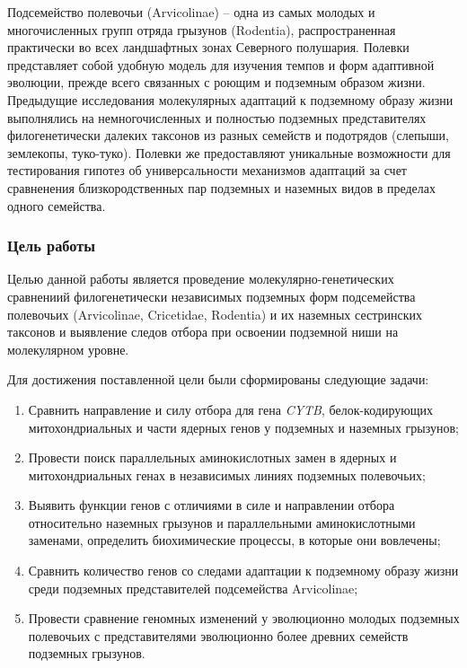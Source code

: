 Подсемейство полевочьи (Arvicolinae) -- одна из самых молодых и многочисленных групп отряда грызунов (Rodentia), распространенная практически во всех ландшафтных зонах Северного полушария. Полевки представляет собой удобную модель для изучения темпов и форм адаптивной эволюции, прежде всего связанных с роющим и подземным образом жизни. Предыдущие исследования молекулярных адаптаций к подземному образу жизни выполнялись на немногочисленных и полностью подземных представителях филогенетически далеких таксонов из разных семейств и подотрядов (слепыши, землекопы, туко-туко). Полевки же предоставляют уникальные возможности для тестирования гипотез об универсальности механизмов адаптаций за счет сравненения близкородственных пар подземных и наземных видов в пределах одного семейства. 

\subsubsection* {Цель работы}

Целью данной работы является проведение молекулярно-генетических сравнениий филогенетически независимых подземных форм подсемейства полевочьих (Arvicolinae, Cricetidae, Rodentia) и их наземных сестринских таксонов и выявление следов отбора при освоении подземной ниши на молекулярном уровне.
\vspace{0pt plus0.5fill}

Для достижения поставленной цели были сформированы следующие задачи:
\begin{enumerate}
	\item Сравнить направление и силу отбора для гена \textit{CYTB}, белок-кодирующих митохондриальных и части ядерных генов у подземных и наземных грызунов;
	\item Провести поиск параллельных аминокислотных замен в ядерных и митохондриальных генах в независимых линиях подземных полевочьих;
	\item Выявить функции генов с отличиями в силе и направлении отбора относительно наземных грызунов и параллельными аминокислотными заменами, определить биохимические процессы, в которые они вовлечены;
	\item Сравнить количество генов со следами адаптации к подземному образу жизни среди подземных представителей подсемейства Arvicolinae;
	\item Провести сравнение геномных изменений у эволюционно молодых подземных полевочьих с представителями эволюционно более древних семейств подземных грызунов. 
\end{enumerate}
%

